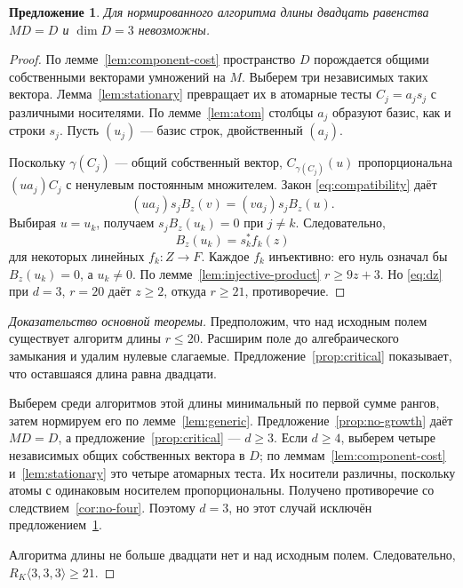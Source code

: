 \documentclass[11pt,a4paper]{article}
\numberwithin{equation}{section}
\theoremstyle{plain}
\newtheorem{prop}[theorem]{Предложение}
\theoremstyle{definition}
\newcommand{\leqs}{\leqslant}\newcommand{\geqs}{\geqslant}
\begin{document}
\begin{prop}\label{prop:three}
Для нормированного алгоритма длины двадцать равенства $MD=D$ и
$\dim D=3$ невозможны.
\end{prop}
\begin{proof}
По лемме~\ref{lem:component-cost} пространство $D$ порождается общими
собственными векторами умножений на $M$. Выберем три независимых
таких вектора. Лемма~\ref{lem:stationary} превращает их в атомарные
тесты $C_j=a_js_j$ с различными носителями.
По лемме~\ref{lem:atom} столбцы $a_j$ образуют базис, как и строки $s_j$.
Пусть $(u_j)$ --- базис строк, двойственный $(a_j)$.

Поскольку $\gamma(C_j)$ --- общий собственный вектор,
$C_{\gamma(C_j)}(u)$ пропорциональна $(ua_j)C_j$ с ненулевым
постоянным множителем. Закон \eqref{eq:compatibility} даёт
\[
 (ua_j)s_j B_z(v)=(va_j)s_j B_z(u).
\]
Выбирая $u=u_k$, получаем $s_jB_z(u_k)=0$ при $j\ne k$.
Следовательно,
\[
 B_z(u_k)=s_k^*f_k(z)
\]
для некоторых линейных $f_k:Z\to F$. Каждое $f_k$ инъективно:
его нуль означал бы $B_z(u_k)=0$, а $u_k\ne0$.
По лемме~\ref{lem:injective-product} $r\geqs9z+3$.
Но \eqref{eq:dz} при $d=3$, $r=20$ даёт $z\geqs2$,
откуда $r\geqs21$, противоречие.
\end{proof}

\begin{proof}[Доказательство основной теоремы]
Предположим, что над исходным полем существует алгоритм длины
$r\leqs20$. Расширим поле до алгебраического замыкания и удалим
нулевые слагаемые. Предложение~\ref{prop:critical} показывает, что
оставшаяся длина равна двадцати.

Выберем среди алгоритмов этой длины минимальный по первой сумме
рангов, затем нормируем его по лемме~\ref{lem:generic}.
Предложение~\ref{prop:no-growth} даёт $MD=D$, а
предложение~\ref{prop:critical} --- $d\geqs3$.
Если $d\geqs4$, выберем четыре независимых общих собственных вектора
в $D$; по леммам~\ref{lem:component-cost} и~\ref{lem:stationary}
это четыре атомарных теста. Их носители различны, поскольку атомы
с одинаковым носителем пропорциональны. Получено противоречие со
следствием~\ref{cor:no-four}.
Поэтому $d=3$, но этот случай исключён предложением~\ref{prop:three}.

Алгоритма длины не больше двадцати нет и над исходным полем.
Следовательно, $R_K\langle3,3,3\rangle\geqs21$.
\end{proof}
\end{document}

